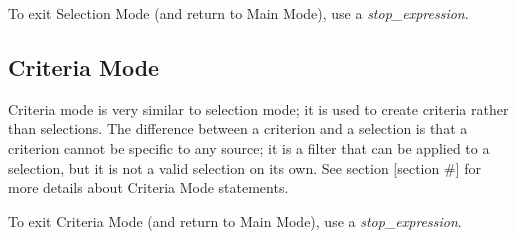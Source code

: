 To exit Selection Mode (and return to Main Mode), use a \emph{stop_expression}.

\subsection{Criteria Mode}
Criteria mode is very similar to selection mode; it is used to create criteria rather than selections. 
The difference between a criterion and a selection is that a criterion cannot be specific to any source; 
it is a filter that can be applied to a selection, but it is not a valid selection on its own. 
See section [section #] for more details about Criteria Mode statements.

To exit Criteria Mode (and return to Main Mode), use a \emph{stop_expression}.

